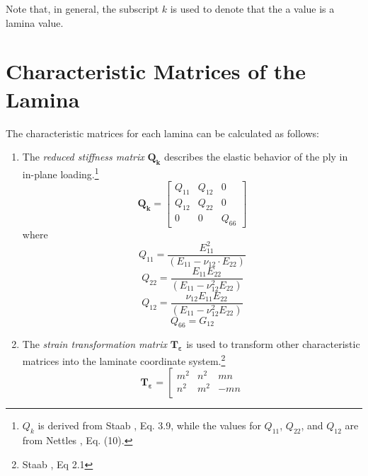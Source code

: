 \documentclass{article}
\begin{document}
  Note that, in general, the subscript $k$ is used to denote that the a value is a lamina value.

\section{Characteristic Matrices of the Lamina}
\label{sec:lamina_matrices}
The characteristic matrices for each lamina can be calculated as follows:

  \begin{enumerate}
    \item The \emph{reduced stiffness matrix} $\bm{Q_{k}}$ describes the elastic behavior of the ply in in-plane loading.\footnote{$Q_{k}$ is derived from Staab \cite{staab}, Eq. 3.9, while the values for $Q_{11}$, $Q_{22}$, and $Q_{12}$ are from Nettles \cite{nasa}, Eq. (10).}
      \begin{equation}
        \label{var:Qk} %
        \bm{Q_{k}} = \left[
                        \begin{array}{ccc}
                          Q_{11} & Q_{12} & 0 \\
                          Q_{12} & Q_{22} & 0 \\
                          0  &      0     & Q_{66}
                        \end{array}
                      \right]
      \end{equation}
      where
      $$
        Q_{11} = \frac{E_{11}^{2}}{\left(E_{11} - \nu_{12} \cdot E_{22}\right)}
      $$ \vspace{1mm}
      $$
        Q_{22} = \frac{E_{11} E_{22}}{\left(E_{11} - \nu_{12}^2 E_{22}\right)}
      $$ \vspace{1mm}
      $$
      Q_{12} = \frac{\nu_{12} E_{11} E_{22}}{\left(E_{11} - \nu_{12}^2 E_{22}\right)}
      $$ \vspace{1mm}
      $$
        Q_{66} = G_{12}
      $$
    \item The \emph{strain transformation matrix} $\bm{T_{\varepsilon}}$ is used to transform other characteristic matrices into the laminate coordinate system.\footnote{Staab \cite{staab}, Eq 2.1}
    \begin{equation}
      \label{var:Tepsilon} %
      \bm{T_{\varepsilon}} = \left[ \begin{array}{ccc}
                                      m^{2} & n^{2} & mn \\
                                      n^{2} & m^{2} & -mn \\

\end{array}
\end{equation}
\end{enumerate}
\end{document}
